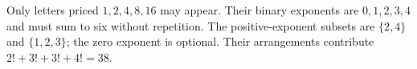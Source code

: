 Only letters priced $1,2,4,8,16$ may appear. Their binary exponents are $0,1,2,3,4$ and must sum to six without repetition. The positive-exponent subsets are $\{2,4\}$ and $\{1,2,3\}$; the zero exponent is optional. Their arrangements contribute $2!+3!+3!+4!=\boxed{38}$.
